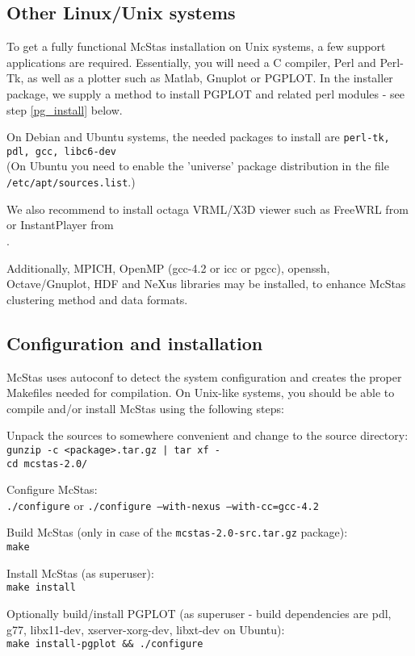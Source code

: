 \subsection{Other Linux/Unix systems}
To get a fully functional McStas installation on Unix systems, a few support
applications are required. Essentially, you will need a C compiler,
Perl and Perl-Tk, as well as a plotter such as Matlab, Gnuplot or
PGPLOT. In the installer package, we supply a method to install PGPLOT
and related perl modules - see step \ref{pg_install} below.

\noindent On Debian and Ubuntu systems, the
needed packages to install are \texttt{perl-tk, pdl, gcc,
  libc6-dev} \\(On Ubuntu you need to enable the 'universe' package
distribution in the file \\\verb+/etc/apt/sources.list+.)

\noindent We also recommend to install octaga VRML/X3D viewer such as
FreeWRL from \\ or 
InstantPlayer from \\.

\noindent Additionally, MPICH, OpenMP (gcc-4.2 or icc or pgcc), openssh, Octave/Gnuplot, HDF and NeXus libraries may be installed, to enhance McStas clustering method and data formats.

\subsection{Configuration and installation}
McStas uses autoconf to detect the system configuration and creates the
proper Makefiles needed for compilation. On Unix-like systems, you
should be able to compile and/or install McStas using the following steps:
\begin{enumerate}
\item{Unpack the sources to somewhere convenient and change to the
    source directory:\\
  \texttt{gunzip -c <package>.tar.gz | tar xf -}\\
  \texttt{cd mcstas-2.0/}}
\item{Configure McStas:\\
  \texttt{./configure} or \texttt{./configure --with-nexus --with-cc=gcc-4.2}}
\item{Build McStas (only in case of the \verb+mcstas-2.0-src.tar.gz+ package):\\
  \texttt{make}}
\item{Install McStas (as superuser):\\
  \texttt{make install}
\item{Optionally build/install PGPLOT (as superuser - build
    dependencies are pdl, g77, libx11-dev, xserver-xorg-dev, libxt-dev
    on Ubuntu):\\
    \texttt{make install-pgplot \&\& ./configure}
    \label{pg_install}}

\label{makeinst}}
\end{enumerate}



